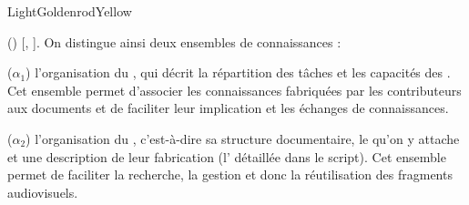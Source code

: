 \begin{problemes}{LightGoldenrodYellow}
\begin{liste}
 	\item[(\g{$\alpha$})]  [, ]. 
 	On distingue ainsi deux ensembles de connaissances : 
 	\begin{listeni} 
 		\item[($\alpha_1$)] l'organisation du , qui décrit la répartition des tâches et  les capacités des .
 		Cet ensemble permet d'associer les connaissances fabriquées par les contributeurs aux documents et de faciliter leur implication et les échanges de connaissances.
 		
 		\item[($\alpha_2$)] l'organisation du , c'est-à-dire sa structure documentaire, le  qu'on y attache et une description de leur fabrication (l' détaillée dans le script).
 		Cet ensemble permet de faciliter la recherche, la gestion et donc la réutilisation des fragments audiovisuels.
 	\end{listeni}


\end{liste}
\end{problemes}

